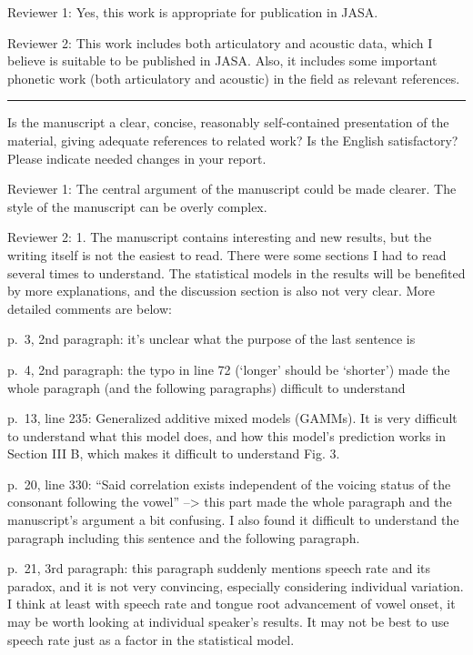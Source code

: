 \documentclass[]{article}
\begin{document}
Reviewer 1: Yes, this work is appropriate for publication in JASA.

Reviewer 2: This work includes both articulatory and acoustic data,
which I believe is suitable to be published in JASA. Also, it includes
some important phonetic work (both articulatory and acoustic) in the
field as relevant references.

\par

\noindent

\rule{\textwidth}{0.4pt}

Is the manuscript a clear, concise, reasonably self-contained
presentation of the material, giving adequate references to related
work? Is the English satisfactory? Please indicate needed changes in
your report.

Reviewer 1: The central argument of the manuscript could be made
clearer. The style of the manuscript can be overly complex.

Reviewer 2: 1. The manuscript contains interesting and new results, but
the writing itself is not the easiest to read. There were some sections
I had to read several times to understand. The statistical models in the
results will be benefited by more explanations, and the discussion
section is also not very clear. More detailed comments are below:

p.~3, 2nd paragraph: it's unclear what the purpose of the last sentence
is

p.~4, 2nd paragraph: the typo in line 72 (`longer' should be `shorter')
made the whole paragraph (and the following paragraphs) difficult to
understand

p.~13, line 235: Generalized additive mixed models (GAMMs). It is very
difficult to understand what this model does, and how this model's
prediction works in Section III B, which makes it difficult to
understand Fig. 3.

p.~20, line 330: ``Said correlation exists independent of the voicing
status of the consonant following the vowel'' --\textgreater{} this part
made the whole paragraph and the manuscript's argument a bit confusing.
I also found it difficult to understand the paragraph including this
sentence and the following paragraph.

p.~21, 3rd paragraph: this paragraph suddenly mentions speech rate and
its paradox, and it is not very convincing, especially considering
individual variation. I think at least with speech rate and tongue root
advancement of vowel onset, it may be worth looking at individual
speaker's results. It may not be best to use speech rate just as a
factor in the statistical model.
\end{document}
